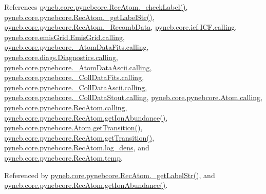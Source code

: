 References \hyperlink{pynebcore_8py_source_l02955}{pyneb.\-core.\-pynebcore.\-Rec\-Atom.\-\_\-check\-Label()}, \hyperlink{pynebcore_8py_source_l02970}{pyneb.\-core.\-pynebcore.\-Rec\-Atom.\-\_\-get\-Label\-Str()}, \hyperlink{pynebcore_8py_source_l02731}{pyneb.\-core.\-pynebcore.\-Rec\-Atom.\-\_\-\-Recomb\-Data}, \hyperlink{icf_8py_source_l00016}{pyneb.\-core.\-icf.\-I\-C\-F.\-calling}, \hyperlink{emis_grid_8py_source_l00044}{pyneb.\-core.\-emis\-Grid.\-Emis\-Grid.\-calling}, \hyperlink{pynebcore_8py_source_l00097}{pyneb.\-core.\-pynebcore.\-\_\-\-Atom\-Data\-Fits.\-calling}, \hyperlink{diags_8py_source_l00169}{pyneb.\-core.\-diags.\-Diagnostics.\-calling}, \hyperlink{pynebcore_8py_source_l00318}{pyneb.\-core.\-pynebcore.\-\_\-\-Atom\-Data\-Ascii.\-calling}, \hyperlink{pynebcore_8py_source_l00585}{pyneb.\-core.\-pynebcore.\-\_\-\-Coll\-Data\-Fits.\-calling}, \hyperlink{pynebcore_8py_source_l00936}{pyneb.\-core.\-pynebcore.\-\_\-\-Coll\-Data\-Ascii.\-calling}, \hyperlink{pynebcore_8py_source_l01156}{pyneb.\-core.\-pynebcore.\-\_\-\-Coll\-Data\-Stout.\-calling}, \hyperlink{pynebcore_8py_source_l01229}{pyneb.\-core.\-pynebcore.\-Atom.\-calling}, \hyperlink{pynebcore_8py_source_l02643}{pyneb.\-core.\-pynebcore.\-Rec\-Atom.\-calling}, \hyperlink{pynebcore_8py_source_l03083}{pyneb.\-core.\-pynebcore.\-Rec\-Atom.\-get\-Ion\-Abundance()}, \hyperlink{pynebcore_8py_source_l01472}{pyneb.\-core.\-pynebcore.\-Atom.\-get\-Transition()}, \hyperlink{pynebcore_8py_source_l02872}{pyneb.\-core.\-pynebcore.\-Rec\-Atom.\-get\-Transition()}, \hyperlink{pynebcore_8py_source_l02743}{pyneb.\-core.\-pynebcore.\-Rec\-Atom.\-log\-\_\-dens}, and \hyperlink{pynebcore_8py_source_l02739}{pyneb.\-core.\-pynebcore.\-Rec\-Atom.\-temp}.



Referenced by \hyperlink{pynebcore_8py_source_l02970}{pyneb.\-core.\-pynebcore.\-Rec\-Atom.\-\_\-get\-Label\-Str()}, and \hyperlink{pynebcore_8py_source_l03083}{pyneb.\-core.\-pynebcore.\-Rec\-Atom.\-get\-Ion\-Abundance()}.


